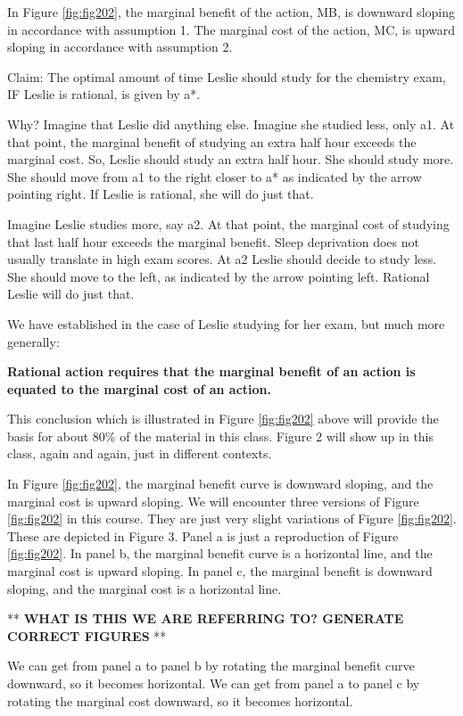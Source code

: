\documentclass[
]{book}
\begin{document}
In Figure \ref{fig:fig202}, the marginal benefit of the action, MB, is downward sloping in accordance with assumption 1. The marginal cost of the action, MC, is upward sloping in accordance with assumption 2.

Claim: The optimal amount of time Leslie should study for the chemistry exam, IF Leslie is rational, is given by a*.

Why? Imagine that Leslie did anything else. Imagine she studied less, only a1. At that point, the marginal benefit of studying an extra half hour exceeds the marginal cost. So, Leslie should study an extra half hour. She should study more. She should move from a1 to the right closer to a* as indicated by the arrow pointing right. If Leslie is rational, she will do just that.

Imagine Leslie studies more, say a2. At that point, the marginal cost of studying that last half hour exceeds the marginal benefit. Sleep deprivation does not usually translate in high exam scores. At a2 Leslie should decide to study less. She should move to the left, as indicated by the arrow pointing left. Rational Leslie will do just that.

We have established in the case of Leslie studying for her exam, but much more generally:

\textbf{Rational action requires that the marginal benefit of an action is equated to the marginal cost of an action.}

This conclusion which is illustrated in Figure \ref{fig:fig202} above will provide the basis for about 80\% of the material in this class. Figure 2 will show up in this class, again and again, just in different contexts.

In Figure \ref{fig:fig202}, the marginal benefit curve is downward sloping, and the marginal cost is upward sloping. We will encounter three versions of Figure \ref{fig:fig202} in this course. They are just very slight variations of Figure \ref{fig:fig202}. These are depicted in Figure 3. Panel a is just a reproduction of Figure \ref{fig:fig202}. In panel b, the marginal benefit curve is a horizontal line, and the marginal cost is upward sloping. In panel c, the marginal benefit is downward sloping, and the marginal cost is a horizontal line.

** \textbf{WHAT IS THIS WE ARE REFERRING TO? GENERATE CORRECT FIGURES} **

We can get from panel a to panel b by rotating the marginal benefit curve downward, so it becomes horizontal. We can get from panel a to panel c by rotating the marginal cost downward, so it becomes horizontal.
\end{document}
